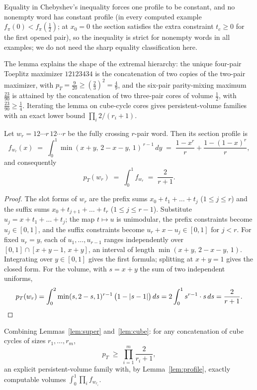 \begin{remark}
Equality in Chebyshev's inequality forces one profile to be constant, and
no nonempty word has constant profile (in every computed example
$f_\pi(0)<f_\pi(\tfrac12)$; at $x_0=0$ the section satisfies the extra
constraint $t_c\ge0$ for the first opened pair), so the inequality is
strict for nonempty words in all examples; we do not need the sharp
equality classification here.

The lemma explains the shape of the extremal hierarchy: the unique
four-pair Toeplitz maximizer $12123434$ is the concatenation of two copies
of the two-pair maximizer, with
$p_T=\tfrac9{20}\ge(\tfrac23)^2=\tfrac49$, and the six-pair parity-mixing
maximum $\tfrac{23}{90}$ is attained by the concatenation of two
three-pair cores of volume $\tfrac12$, with
$\tfrac{23}{90}\ge\tfrac14$.  Iterating the lemma on cube-cycle cores
gives persistent-volume families with an exact lower bound
$\prod_i 2/(r_i+1)$.
\end{remark}

\begin{lemma}\label{lem:cube}
Let $w_r=12\cdots r\,12\cdots r$ be the fully crossing $r$-pair word.  Then
its section profile is
\[
f_{w_r}(x)\;=\;\int_0^1\min(x+y,\,2-x-y,\,1)^{\,r-1}\,dy
\;=\;\frac{1-x^r}{r}+\frac{1-(1-x)^r}{r},
\]
and consequently
\[
p_T(w_r)\;=\;\int_0^1 f_{w_r}\;=\;\frac{2}{r+1}.
\]
\end{lemma}

\begin{proof}
The slot forms of $w_r$ are the prefix sums $x_0+t_1+\dots+t_j$
($1\le j\le r$) and the suffix sums $x_0+t_{j+1}+\dots+t_r$
($1\le j\le r-1$).  Substitute $u_j=x+t_1+\dots+t_j$; the map
$t\mapsto u$ is unimodular, the prefix constraints become $u_j\in[0,1]$,
and the suffix constraints become $u_r+x-u_j\in[0,1]$ for $j<r$.  For
fixed $u_r=y$, each of $u_1,\dots,u_{r-1}$ ranges independently over
$[0,1]\cap[x+y-1,\,x+y]$, an interval of length
$\min(x+y,\,2-x-y,\,1)$.  Integrating over $y\in[0,1]$ gives the first
formula; splitting at $x+y=1$ gives the closed form.  For the volume,
with $s=x+y$ the sum of two independent uniforms,
\[
p_T(w_r)=\int_0^2\min(s,2-s,1)^{r-1}\,\bigl(1-|s-1|\bigr)\,ds
=2\int_0^1 s^{r-1}\cdot s\,ds=\frac{2}{r+1}. \qedhere
\]
\end{proof}

Combining Lemmas~\ref{lem:super} and~\ref{lem:cube}: for any concatenation
of cube cycles of sizes $r_1,\dots,r_m$,
\[
p_T\;\ge\;\prod_{i=1}^m\frac{2}{r_i+1},
\]
an explicit persistent-volume family with, by
Lemma~\ref{lem:profile}, exactly computable volumes
$\int_0^1\prod_i f_{w_{r_i}}$.

